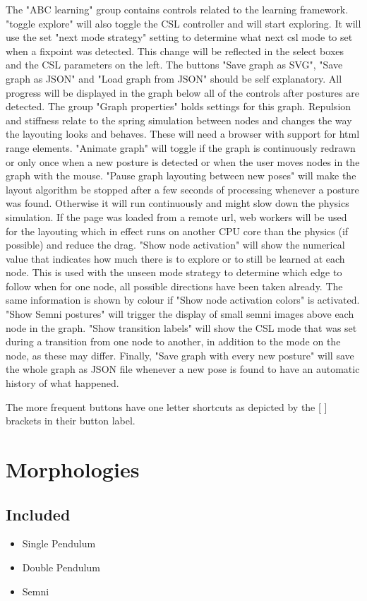 \documentclass[10pt,a4paper]{article}
\begin{document}
The "ABC learning" group contains controls related to the learning framework. "toggle explore" will also toggle the CSL controller and will start exploring. It will use the set "next mode strategy" setting to determine what next csl mode to set when a fixpoint was detected. This change will be reflected in the select boxes and the CSL parameters on the left.
The buttons "Save graph as SVG", "Save graph as JSON" and "Load graph from JSON" should be self explanatory.
All progress will be displayed in the graph below all of the controls after postures are detected. The group "Graph properties" holds settings for this graph. Repulsion and stiffness relate to the spring simulation between nodes and changes the way the layouting looks and behaves. These will need a browser with support for html range elements. "Animate graph" will toggle if the graph is continuously redrawn or only once when a new posture is detected or when the user moves nodes in the graph with the mouse. "Pause graph layouting between new poses" will make the layout algorithm be stopped after a few seconds of processing whenever a posture was found. Otherwise it will run continuously and might slow down the physics simulation. If the page was loaded from a remote url, web workers will be used for the layouting which in effect runs on another CPU core than the physics (if possible) and reduce the drag.
"Show node activation" will show the numerical value that indicates how much there is to explore or to still be learned at each node. This is used with the unseen mode strategy to determine which edge to follow when for one node, all possible directions have been taken already. The same information is shown by colour if "Show node activation colors" is activated. "Show Semni postures" will trigger the display of small semni images above each node in the graph. "Show transition labels" will show the CSL mode that was set during a transition from one node to another, in addition to the mode on the node, as these may differ. Finally, "Save graph with every new posture" will save the whole graph as JSON file whenever a new pose is found to have an automatic history of what happened.

The more frequent buttons have one letter shortcuts as depicted by the [ ] brackets in their button label.

\section{Morphologies}
\subsection{Included}
\begin{itemize}
\item Single Pendulum
\item Double Pendulum
\item Semni
\end{itemize}
\end{document}
